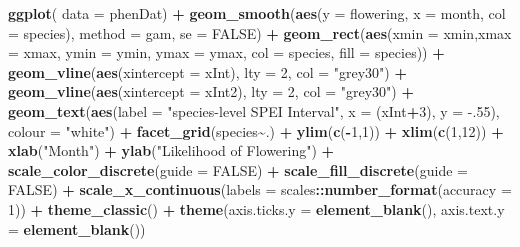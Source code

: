 \documentclass[
]{article}
\newenvironment{Shaded}{\begin{snugshade}}{\end{snugshade}}
\newcommand{\DataTypeTok}[1]{\textcolor[rgb]{0.13,0.29,0.53}{#1}}
\newcommand{\DecValTok}[1]{\textcolor[rgb]{0.00,0.00,0.81}{#1}}
\newcommand{\FloatTok}[1]{\textcolor[rgb]{0.00,0.00,0.81}{#1}}
\newcommand{\KeywordTok}[1]{\textcolor[rgb]{0.13,0.29,0.53}{\textbf{#1}}}
\newcommand{\NormalTok}[1]{#1}
\newcommand{\OperatorTok}[1]{\textcolor[rgb]{0.81,0.36,0.00}{\textbf{#1}}}
\newcommand{\OtherTok}[1]{\textcolor[rgb]{0.56,0.35,0.01}{#1}}
\newcommand{\StringTok}[1]{\textcolor[rgb]{0.31,0.60,0.02}{#1}}
\begin{document}
\begin{Shaded}
\begin{Highlighting}[]
\KeywordTok{ggplot}\NormalTok{( }\DataTypeTok{data =}\NormalTok{ phenDat) }\OperatorTok{+}
\StringTok{  }\KeywordTok{geom\_smooth}\NormalTok{(}\KeywordTok{aes}\NormalTok{(}\DataTypeTok{y =}\NormalTok{ flowering, }\DataTypeTok{x =}\NormalTok{  month, }\DataTypeTok{col =}\NormalTok{ species), }\DataTypeTok{method =} \StringTok{\textquotesingle{}gam\textquotesingle{}}\NormalTok{, }\DataTypeTok{se =} \OtherTok{FALSE}\NormalTok{) }\OperatorTok{+}
\StringTok{  }\KeywordTok{geom\_rect}\NormalTok{(}\KeywordTok{aes}\NormalTok{(}\DataTypeTok{xmin =}\NormalTok{ xmin,}\DataTypeTok{xmax =}\NormalTok{ xmax, }\DataTypeTok{ymin =}\NormalTok{ ymin, }\DataTypeTok{ymax =}\NormalTok{ ymax, }\DataTypeTok{col =}\NormalTok{ species, }\DataTypeTok{fill =}\NormalTok{ species)) }\OperatorTok{+}
\StringTok{  }\KeywordTok{geom\_vline}\NormalTok{(}\KeywordTok{aes}\NormalTok{(}\DataTypeTok{xintercept =}\NormalTok{ xInt), }\DataTypeTok{lty =} \DecValTok{2}\NormalTok{, }\DataTypeTok{col =} \StringTok{"grey30"}\NormalTok{) }\OperatorTok{+}
\StringTok{  }\KeywordTok{geom\_vline}\NormalTok{(}\KeywordTok{aes}\NormalTok{(}\DataTypeTok{xintercept =}\NormalTok{ xInt2), }\DataTypeTok{lty =} \DecValTok{2}\NormalTok{, }\DataTypeTok{col =} \StringTok{"grey30"}\NormalTok{) }\OperatorTok{+}\StringTok{ }
\StringTok{  }\KeywordTok{geom\_text}\NormalTok{(}\KeywordTok{aes}\NormalTok{(}\DataTypeTok{label =} \StringTok{"species{-}level SPEI Interval"}\NormalTok{, }\DataTypeTok{x =}\NormalTok{ (xInt}\OperatorTok{+}\DecValTok{3}\NormalTok{), }\DataTypeTok{y =} \FloatTok{{-}.55}\NormalTok{), }\DataTypeTok{colour =} 
              \StringTok{"white"}\NormalTok{) }\OperatorTok{+}
\StringTok{  }\KeywordTok{facet\_grid}\NormalTok{(species}\OperatorTok{\textasciitilde{}}\NormalTok{.) }\OperatorTok{+}
\StringTok{  }\KeywordTok{ylim}\NormalTok{(}\KeywordTok{c}\NormalTok{(}\OperatorTok{{-}}\DecValTok{1}\NormalTok{,}\DecValTok{1}\NormalTok{)) }\OperatorTok{+}\StringTok{ }
\StringTok{  }\KeywordTok{xlim}\NormalTok{(}\KeywordTok{c}\NormalTok{(}\DecValTok{1}\NormalTok{,}\DecValTok{12}\NormalTok{)) }\OperatorTok{+}
\StringTok{  }\KeywordTok{xlab}\NormalTok{(}\StringTok{"Month"}\NormalTok{) }\OperatorTok{+}
\StringTok{  }\KeywordTok{ylab}\NormalTok{(}\StringTok{"Likelihood of Flowering"}\NormalTok{) }\OperatorTok{+}
\StringTok{  }\KeywordTok{scale\_color\_discrete}\NormalTok{(}\DataTypeTok{guide =} \OtherTok{FALSE}\NormalTok{) }\OperatorTok{+}
\StringTok{  }\KeywordTok{scale\_fill\_discrete}\NormalTok{(}\DataTypeTok{guide =} \OtherTok{FALSE}\NormalTok{) }\OperatorTok{+}
\StringTok{  }\KeywordTok{scale\_x\_continuous}\NormalTok{(}\DataTypeTok{labels =}\NormalTok{ scales}\OperatorTok{::}\KeywordTok{number\_format}\NormalTok{(}\DataTypeTok{accuracy =} \DecValTok{1}\NormalTok{)) }\OperatorTok{+}
\StringTok{  }\KeywordTok{theme\_classic}\NormalTok{() }\OperatorTok{+}\StringTok{  }
\StringTok{  }\KeywordTok{theme}\NormalTok{(}\DataTypeTok{axis.ticks.y =} \KeywordTok{element\_blank}\NormalTok{(),}
        \DataTypeTok{axis.text.y =} \KeywordTok{element\_blank}\NormalTok{()) }
\end{Highlighting}
\end{Shaded}
\end{document}

